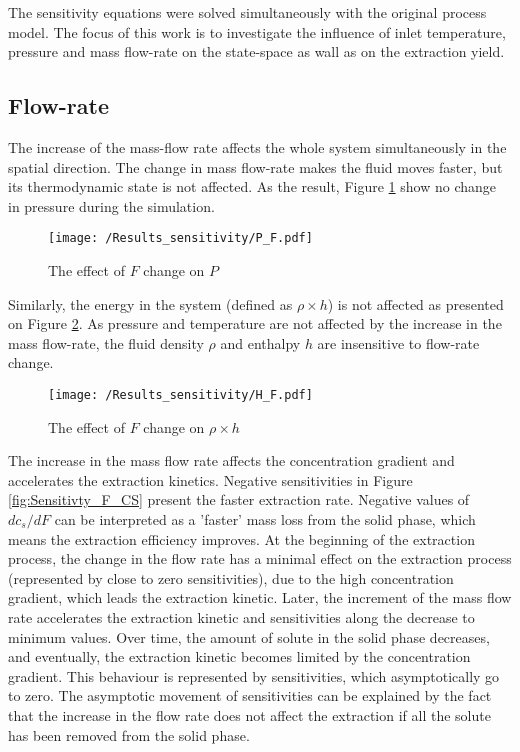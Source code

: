 \documentclass[../Article_Model_Parameters.tex]{subfiles}
\begin{document}
	
	\label{CH: Results}
	
	The sensitivity equations were solved simultaneously with the original process model. The focus of this work is to investigate the influence of inlet temperature, pressure and mass flow-rate on the state-space as wall as on the extraction yield. 
	
	\subsection{Flow-rate}
	
	The increase of the mass-flow rate affects the whole system simultaneously in the spatial direction. The change in mass flow-rate makes the fluid moves faster, but its thermodynamic state is not affected. As the result, Figure \ref{fig:Sensitivty_F_P} show no change in pressure during the simulation. 
    
    \begin{figure}[h!]
    	\centering
    	\texttt{[image: /Results\_sensitivity/P\_F.pdf]}
    	\caption{The effect of $F$ change on $P$}
    	\label{fig:Sensitivty_F_P}
    \end{figure}
    
    Similarly, the energy in the system (defined as $\rho \times h$) is not affected as presented on Figure \ref{fig:Sensitivty_F_H}. As pressure and temperature are not affected by the increase in the mass flow-rate, the fluid density $\rho$ and enthalpy $h$ are insensitive to flow-rate change.
    
    \begin{figure}[h!]
    	\centering
    	\texttt{[image: /Results\_sensitivity/H\_F.pdf]}
    	\caption{The effect of $F$ change on $\rho \times h$}
    	\label{fig:Sensitivty_F_H}
    \end{figure}
    
    The increase in the mass flow rate affects the concentration gradient and accelerates the extraction kinetics. Negative sensitivities in Figure \ref{fig:Sensitivty_F_CS} present the faster extraction rate. Negative values of $dc_s/dF$ can be interpreted as a 'faster' mass loss from the solid phase, which means the extraction efficiency improves. At the beginning of the extraction process, the change in the flow rate has a minimal effect on the extraction process (represented by close to zero sensitivities), due to the high concentration gradient, which leads the extraction kinetic. Later, the increment of the mass flow rate accelerates the extraction kinetic and sensitivities along the decrease to minimum values. Over time, the amount of solute in the solid phase decreases, and eventually, the extraction kinetic becomes limited by the concentration gradient. This behaviour is represented by sensitivities, which asymptotically go to zero. The asymptotic movement of sensitivities can be explained by the fact that the increase in the flow rate does not affect the extraction if all the solute has been removed from the solid phase.
    
\end{document}
